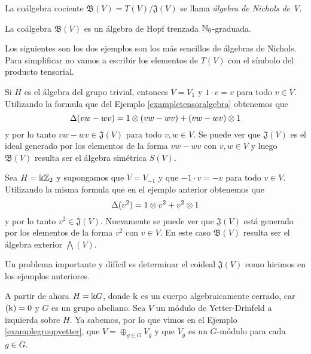 \documentclass[a4paper,oneside,fleqn,11pt,../tesis.tex]{subfiles}
\begin{document}
\begin{definition}
	La coálgebra cociente $\mathfrak{B}(V) = T(V)/\mathfrak{J}(V)$ se llama \emph{álgebra de Nichols de V}.
\end{definition}

\begin{Teorema}
	La coálgebra $\mathfrak{B}(V)$ es un álgebra de Hopf trenzada $\mathbb{N}_{0}$-graduada.
\end{Teorema}

Los siguientes son los dos ejemplos son los más sencillos de álgebras de Nichols. Para simplificar
no vamos a escribir los elementos de $T(V)$ con el símbolo del producto tensorial.
\begin{example}
	Si $H$ es el álgebra del grupo trivial, entonces $V = V_1$ y $1\cdot v = v$ para todo $v \in V$.
	Utilizando la formula que del Ejemplo \ref{exampletensoralgebra} obtenemos que
	\[
		\Delta(vw - wv) = 1\otimes (vw -wv) + (vw - wv)\otimes 1
	\]
	y por lo tanto $vw - wv \in \mathfrak{J}(V)$ para todo $v, w \in V$. Se puede ver que $\mathfrak{J}(V)$ es el ideal
	generado por los elementos de la forma $vw - wv$ con $v, w \in V$ y luego
	$\mathfrak{B}(V)$ resulta ser el álgebra simétrica $S(V)$.
\end{example}

\begin{example}
	Sea $H = \Bbbk \mathbb{Z}_{2}$ y supongamos que $V = V_{-1}$ y que $-1 \cdot v = -v$ para todo $v \in V$.
	Utilizando la misma formula que en el ejemplo anterior obtenemos que
	\[
		\Delta(v^2) = 1\otimes v^2 + v^2 \otimes 1
	\]
	y por lo tanto $v^2 \in \mathfrak{J}(V)$. Nuevamente se puede ver que $\mathfrak{J}(V)$
	está generado por los elementos de la forma $v^2$ con $v \in V$.
	En este caso $\mathfrak{B}(V)$ resulta ser el álgebra exterior $\bigwedge(V)$.
\end{example}
Un problema importante y difícil es determinar el coideal $\mathfrak{J}(V)$ como hicimos en los ejemplos
anteriores.

A partir de ahora $H = \Bbbk G$, donde $\Bbbk$ es un cuerpo algebraicamente cerrado, car$(\Bbbk) = 0$ y
$G$ es un grupo abeliano. Sea $V$ un módulo de Yetter-Drinfeld a izquierda sobre $H$. Ya sabemos, por lo que vimos en el Ejemplo \ref{examplegroupyetter}, que $V = \oplus_{g \in G} V_g$ y que $V_g$ es un $G$-módulo para cada $g \in G$.
\end{document}
